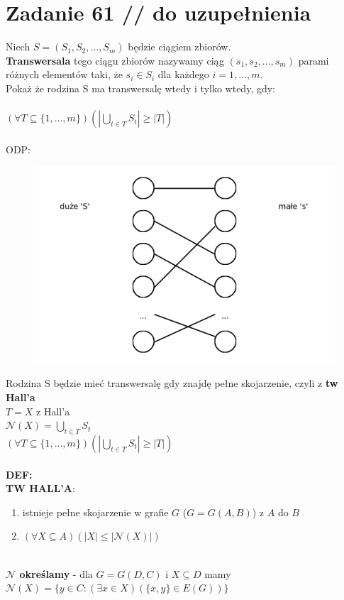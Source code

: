 \documentclass{article}
\begin{document}
\section{\centering Zadanie 61 // do uzupełnienia}
Niech $S = (S_{1}, S_{2},..., S_{m})$ będzie ciągiem zbiorów.\\ \textbf{Transwersala} tego ciągu zbiorów nazywamy ciąg $(s_{1},s_{2},...,s_{m})$ parami różnych elementów taki, że $s_{i} \in S_{i}$ dla każdego $i=1,...,m$.\\ Pokaż że rodzina S ma transwersalę wtedy i tylko wtedy, gdy:\\\\
$(\forall T \subseteq \{1,...,m\})(|\bigcup_{t\in T}S_{t}| \geq |T|)$\\\\
ODP:\\
\begin{figure}[H]
	\centering
	\includegraphics[width=0.5\linewidth]{z61.png}  
\end{figure}
\noindent Rodzina S będzie mieć transwersalę gdy znajdę pełne skojarzenie, czyli z \textbf{tw Hall'a}\\
$T = X$ z Hall'a \\ 
$\mathcal{N}(X) = \bigcup_{t\in T}S_{t}$ \\
$(\forall T \subseteq \{1,...,m\})(|\bigcup_{t\in T}S_{t}| \geq |T|)$\\\\
\noindent \textbf{DEF:} \\
\textbf{TW HALL'A}: \\
\begin{enumerate}
	\item istnieje pełne skojarzenie w grafie $G$ ($G=G(A,B)$) z $A$ do $B$
	\item $(\forall X \subseteq A)(|X| \leq |\mathcal{N}(X)|)$ \\\\
\end{enumerate}
\textbf{$\mathcal{N}$ określamy} - dla $G = G(D,C)$ i $X \subseteq D$ mamy $\mathcal{N}(X) = \{y \in C : (\exists x \in X)(\{x,y\} \in E(G))\}$\\
\end{document}
